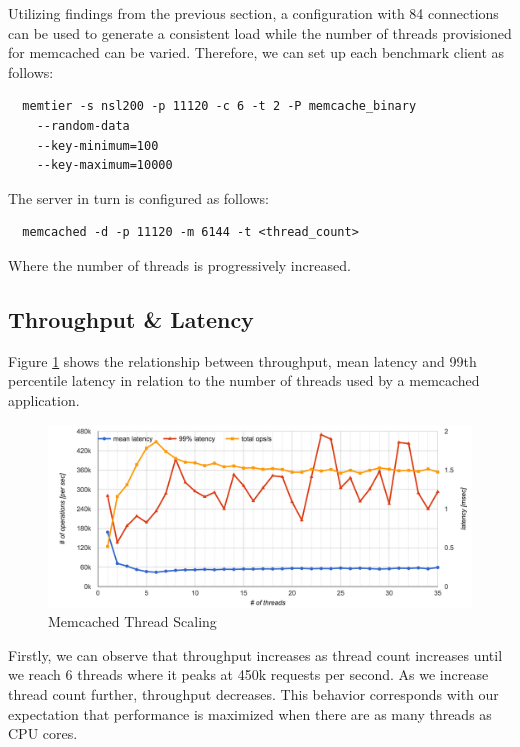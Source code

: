 Utilizing findings from the previous section, a configuration with 84 connections can be used to generate a consistent load while the number of threads provisioned for memcached can be varied. Therefore, we can set up each benchmark client as follows:

\begin{lstlisting}
  memtier -s nsl200 -p 11120 -c 6 -t 2 -P memcache_binary
    --random-data
    --key-minimum=100
    --key-maximum=10000
\end{lstlisting}

The server in turn is configured as follows:
\begin{lstlisting}
  memcached -d -p 11120 -m 6144 -t <thread_count>
\end{lstlisting}

Where the number of threads is progressively increased.

\subsection{Throughput \& Latency}

Figure \ref{fig:memcached-threads} shows the relationship between throughput, mean latency and 99th percentile latency in relation to the number of threads used by a memcached application.

\begin{figure}[h]
    \includegraphics[width=\textwidth]{./res/5_memcached_threads.png}
    \caption{Memcached Thread Scaling}
    \label{fig:memcached-threads}
\end{figure}

Firstly, we can observe that throughput increases as thread count increases until we reach 6 threads where it peaks at 450k requests per second. As we increase thread count further, throughput decreases. This behavior corresponds with our expectation that performance is maximized when there are as many threads as CPU cores.

